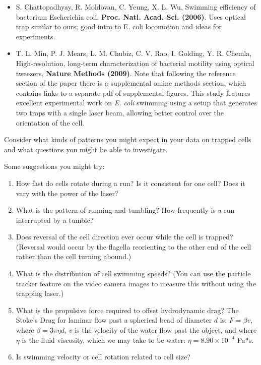 \documentclass{../lab}
\begin{document}
\begin{itemize}
    \item S. Chattopadhyay, R. Moldovan, C. Yeung, X. L. Wu, Swimming efficiency of bacterium Escherichia coli. \textbf{Proc. Natl. Acad. Sci. (2006)}. Uses optical trap similar to ours; good intro to E. coli locomotion and ideas for experiments.

    \item T. L. Min, P. J. Mears, L. M. Chubiz, C. V. Rao, I. Golding, Y. R. Chemla, High-resolution, long-term characterization of bacterial motility using optical tweezers, \textbf{Nature Methods (2009)}. Note that following the reference section of the paper there is a supplemental online methods section, which contains links to a separate pdf of supplemental figures. This study features excellent experimental work on \emph{E. coli} swimming using a setup that generates two traps with a single laser beam, allowing better control over the orientation of the cell.
\end{itemize}

Consider what kinds of patterns you might expect in your data on trapped cells and what questions you might be able to investigate.

Some suggestions you might try:

\begin{enumerate}
    \item How fast do cells rotate during a run? Is it consistent for one cell? Does it vary with the power of the laser?

    \item What is the pattern of running and tumbling? How frequently is a run interrupted by a tumble?

    \item Does reversal of the cell direction ever occur while the cell is trapped? (Reversal would occur by the flagella reorienting to the other end of the cell rather than the cell turning abound.)

    \item What is the distribution of cell swimming speeds? (You can use the particle tracker feature on the video camera images to measure this without using the trapping laser.)

    \item What is the propulsive force required to offset hydrodynamic drag? The Stoke's Drag for laminar flow past a spherical bead of diameter $d$ is: $F = \beta v$, where $\beta = 3\pi\eta d$, $v$ is the velocity of the water flow past the object, and where $\eta$ is the fluid viscosity, which we may take to be water: $\eta = 8.90 \times 10^{-4}$ Pa*s.

    \item Is swimming velocity or cell rotation related to cell size?

\end{enumerate}
\end{document}
